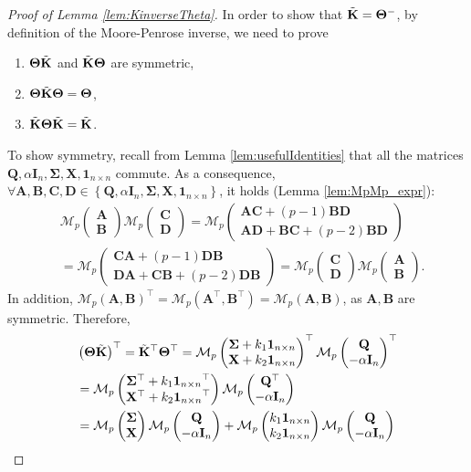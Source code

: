 \documentclass[12pt]{article}
\theoremstyle{plain}
\theoremstyle{remark}
\newcommand{\round}[1]{\left( #1 \right)}
\newcommand{\curly}[1]{\left\{ #1 \right\}}
\newcommand{\Mv}[3]{\mathcal{M}_{#1}\begin{pmatrix}
	#2\\
	#3
\end{pmatrix}}
\newcommand{\Mh}[3]{\mathcal{M}_{#1}\round{#2,#3}}
\newcommand{\onenn}[0]{{\mathbf{1}_{n\times n}}}
\newcommand{\latMatr}[1]{\mathbf{#1}}          %
\newcommand{\grMatr}[1]{{\boldsymbol{#1}}}   %
\begin{document}
    \begin{proof}[Proof of Lemma \ref{lem:KinverseTheta}]
        In order to show that $\Tilde{\latMatr K} = \grMatr{\Theta}^-$, by definition of the Moore-Penrose inverse, we need to prove
        \begin{enumerate}
            \item $\grMatr{\Theta} \Tilde{\latMatr K}$ and $\Tilde{\latMatr K} \grMatr{\Theta}$ are symmetric,
            \item $\grMatr{\Theta} \Tilde{\latMatr K} \grMatr{\Theta} = \grMatr{\Theta}$,
            \item $\Tilde{\latMatr K} \grMatr{\Theta} \Tilde{\latMatr K} = \Tilde{\latMatr K}$.
        \end{enumerate}
        To show symmetry, recall from Lemma \ref{lem:usefulIdentities} that all the matrices $\latMatr Q,\alpha \latMatr{I}_n, {\grMatr{\Sigma}}, \latMatr X, \onenn$ commute. As a consequence, $\forall {\latMatr{A}},{\latMatr{B}},{\latMatr{C}},{\latMatr{D}} \in \curly{\latMatr Q,\alpha \latMatr{I}_n, {\grMatr{\Sigma}}, \latMatr X, \onenn}$, it holds (Lemma \ref{lem:MpMp_expr}):
        \begin{align*}
            &\Mv{p}{{\latMatr{A}}}{{\latMatr{B}}}\Mv{p}{{\latMatr{C}}}{{\latMatr{D}}} = \Mv{p}{{\latMatr{A}}{\latMatr{C}}+(p-1){\latMatr{B}}{\latMatr{D}}}{{\latMatr{A}}{\latMatr{D}}+{\latMatr{B}}{\latMatr{C}}+(p-2){\latMatr{B}}{\latMatr{D}}}\\
            &=\Mv{p}{{\latMatr{C}}{\latMatr{A}}+(p-1){\latMatr{D}}{\latMatr{B}}}{{\latMatr{D}}{\latMatr{A}}+{\latMatr{C}}{\latMatr{B}}+(p-2){\latMatr{D}}{\latMatr{B}}}=\Mv{p}{{\latMatr{C}}}{{\latMatr{D}}}\Mv{p}{{\latMatr{A}}}{{\latMatr{B}}}.
        \end{align*}
        In addition, $\Mh{p}{{\latMatr{A}}}{{\latMatr{B}}}^\top=\Mh{p}{{\latMatr{A}}^\top}{{\latMatr{B}}^\top}=\Mh{p}{{\latMatr{A}}}{{\latMatr{B}}}$, as ${\latMatr{A}},{\latMatr{B}}$ are symmetric. Therefore,
        \begin{align*}
            &\round{\grMatr{\Theta} \Tilde{\latMatr K}}^\top = \Tilde{\latMatr K}^\top \grMatr{\Theta}^\top = \Mv{p}{{\grMatr{\Sigma}} + k_1 \onenn}{\latMatr X + k_2 \onenn}^\top \Mv{p}{{\latMatr Q}}{-\alpha \latMatr{I}_n}^\top \\
            &= \Mv{p}{{\grMatr{\Sigma}}^\top + k_1 \onenn^\top}{\latMatr X^\top + k_2 \onenn^\top} \Mv{p}{{\latMatr Q}^\top}{-\alpha \latMatr{I}_n} \\
            &=\Mv{p}{{\grMatr{\Sigma}}}{\latMatr X} \Mv{p}{{\latMatr Q}}{-\alpha \latMatr{I}_n} + \Mv{p}{k_1 \onenn}{k_2 \onenn} \Mv{p}{{\latMatr Q}}{-\alpha \latMatr{I}_n} \\

\end{align*}
\end{proof}
\end{document}
